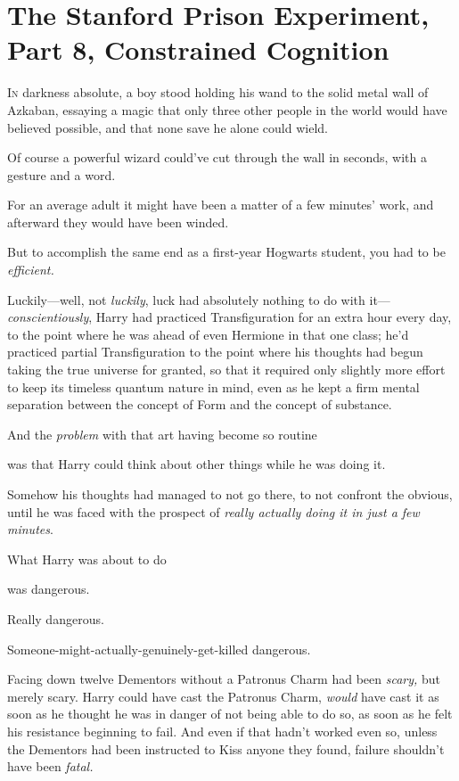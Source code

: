 \chapter{The Stanford Prison Experiment, Part 8, Constrained Cognition}

\lettrine{I}{n} darkness absolute, a boy stood holding his wand to the solid metal wall of
Azkaban, essaying a magic that only three other people in the world would have
believed possible, and that none save he alone could wield.

Of course a powerful wizard could've cut through the wall in seconds, with a
gesture and a word.

For an average adult it might have been a matter of a few minutes' work, and
afterward they would have been winded.

But to accomplish the same end as a first-year Hogwarts student, you had to be
\emph{efficient.}

Luckily---well, not \emph{luckily}, luck had absolutely nothing to do with
it---\emph{conscientiously}, Harry had practiced Transfiguration for an extra
hour every day, to the point where he was ahead of even Hermione in that one
class; he'd practiced partial Transfiguration to the point where his thoughts
had begun taking the true universe for granted, so that it required only
slightly more effort to keep its timeless quantum nature in mind, even as he
kept a firm mental separation between the concept of Form and the concept of
substance.

And the \emph{problem} with that art having become so routine{\el}

{\el} was that Harry could think about other things while he was doing it.

Somehow his thoughts had managed to not go there, to not confront the obvious,
until he was faced with the prospect of \emph{really actually doing it in just
a few minutes}.

What Harry was about to do{\el}

{\el} was dangerous.

Really dangerous.

Someone-might-actually-genuinely-get-killed dangerous.

Facing down twelve Dementors without a Patronus Charm had been \emph{scary,}
but merely scary. Harry could have cast the Patronus Charm, \emph{would} have
cast it as soon as he thought he was in danger of not being able to do so, as
soon as he felt his resistance beginning to fail. And even if that hadn't
worked{\el} even so, unless the Dementors had been instructed to Kiss anyone
they found, failure shouldn't have been \emph{fatal.}

